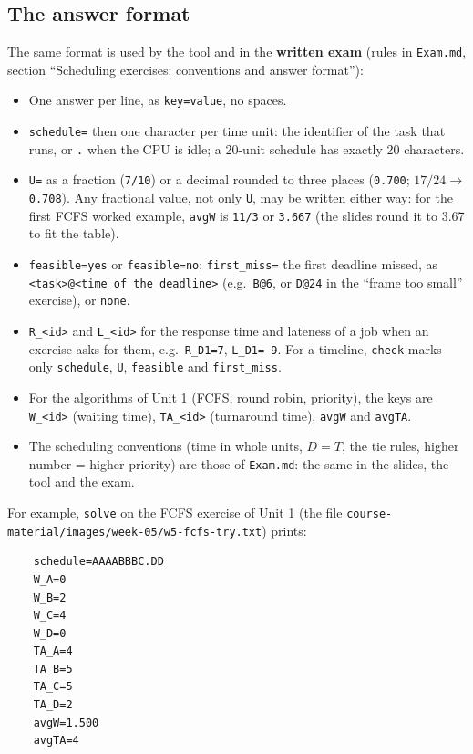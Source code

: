 \subsection{The answer format}
The same format is used by the tool and in the \textbf{written exam} (rules in \texttt{Exam.md}, section ``Scheduling exercises: conventions and answer format''):
\begin{itemize}
    \item One answer per line, as \texttt{key=value}, no spaces.
    \item \texttt{schedule=} then one character per time unit: the identifier of the task that runs, or \texttt{.} when the CPU is idle; a 20-unit schedule has exactly 20 characters.
    \item \texttt{U=} as a fraction (\texttt{7/10}) or a decimal rounded to three places (\texttt{0.700}; $17/24 \to$ \texttt{0.708}). Any fractional value, not only \texttt{U}, may be written either way: for the first FCFS worked example, \texttt{avgW} is \texttt{11/3} or \texttt{3.667} (the slides round it to 3.67 to fit the table).
    \item \texttt{feasible=yes} or \texttt{feasible=no}; \texttt{first\_miss=} the first deadline missed, as \texttt{<task>@<time of the deadline>} (e.g.\ \texttt{B@6}, or \texttt{D@24} in the ``frame too small'' exercise), or \texttt{none}.
    \item \texttt{R\_<id>} and \texttt{L\_<id>} for the response time and lateness of a job when an exercise asks for them, e.g.\ \texttt{R\_D1=7}, \texttt{L\_D1=-9}. For a timeline, \texttt{check} marks only \texttt{schedule}, \texttt{U}, \texttt{feasible} and \texttt{first\_miss}.
    \item For the algorithms of Unit 1 (FCFS, round robin, priority), the keys are \texttt{W\_<id>} (waiting time), \texttt{TA\_<id>} (turnaround time), \texttt{avgW} and \texttt{avgTA}.
    \item The scheduling conventions (time in whole units, $D = T$, the tie rules, higher number = higher priority) are those of \texttt{Exam.md}: the same in the slides, the tool and the exam.
\end{itemize}
For example, \texttt{solve} on the FCFS exercise of Unit 1 (the file \texttt{course-material/images/week-05/w5-fcfs-try.txt}) prints:
\begin{verbatim}
    schedule=AAAABBBC.DD
    W_A=0
    W_B=2
    W_C=4
    W_D=0
    TA_A=4
    TA_B=5
    TA_C=5
    TA_D=2
    avgW=1.500
    avgTA=4
\end{verbatim}

